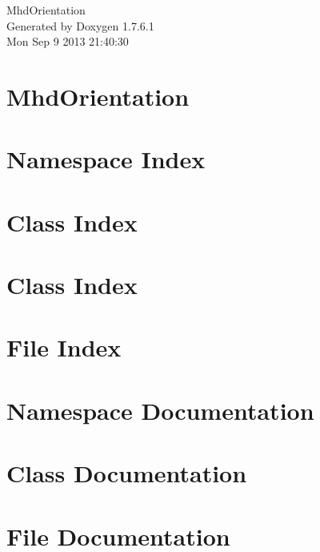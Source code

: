 \documentclass[a4paper]{book}
\begin{document}
\hypersetup{pageanchor=false,citecolor=blue}
\begin{titlepage}
\vspace*{7cm}
\begin{center}
{\Large \-Mhd\-Orientation }\\
\vspace*{1cm}
{\large \-Generated by Doxygen 1.7.6.1}\\
\vspace*{0.5cm}
{\small Mon Sep 9 2013 21:40:30}\\
\end{center}
\end{titlepage}
\clearemptydoublepage
{}
\tableofcontents
\clearemptydoublepage
{}
\hypersetup{pageanchor=true,citecolor=blue}
\chapter{\-Mhd\-Orientation}
\label{index}\hypertarget{index}{}
\chapter{\-Namespace \-Index}

\chapter{\-Class \-Index}

\chapter{\-Class \-Index}

\chapter{\-File \-Index}

\chapter{\-Namespace \-Documentation}


\chapter{\-Class \-Documentation}









\chapter{\-File \-Documentation}














\printindex
\end{document}
